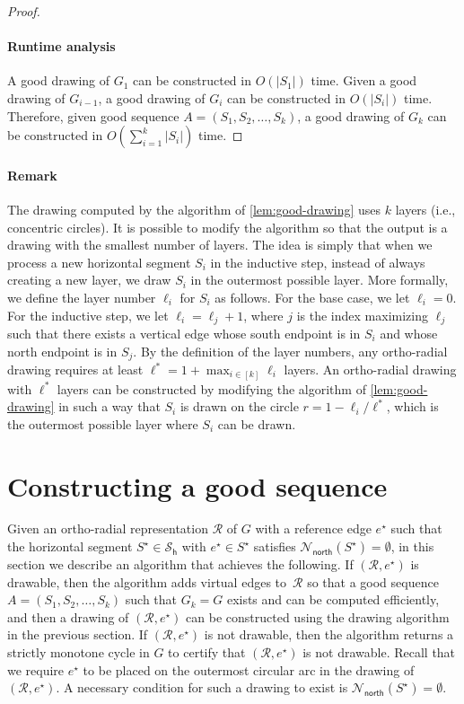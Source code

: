 \documentclass{theoretics}
\newcommand{\RR}{\mathcal{R}}
\newcommand{\PH}{\mathcal{S}_\mathsf{h}}
\newcommand{\Nnorth}{\mathcal{N}_\mathsf{north}}
\newcommand{\eref}{e^\star}
\begin{document}
\begin{proof}
\paragraph{Runtime analysis} A good drawing of $G_1$ can be constructed in $O\left(|S_1|\right)$ time. Given a good drawing of  $G_{i-1}$, a good drawing of $G_{i}$ can be constructed in $O\left(|S_i|\right)$ time. Therefore,  given good sequence $A=(S_1, S_2, \ldots, S_{k})$, a good drawing of $G_k$ can be constructed in $O\left(\sum_{i=1}^k |S_i|\right)$ time.
\end{proof}


\paragraph{Remark} The drawing computed by the algorithm of \cref{lem:good-drawing} uses $k$ layers (i.e., concentric circles). It is possible to modify the algorithm so that the output is a drawing with the smallest number of layers. The idea is simply that when we process a new horizontal segment $S_i$ in the inductive step, instead of always creating a new layer, we draw $S_i$ in the outermost possible layer. More formally, we define the layer number $\ell_i$ for $S_i$ as follows. For the base case, we let $\ell_i = 0$. For the inductive step, we let $\ell_i = \ell_j + 1$, where $j$ is the index maximizing $\ell_j$ such that there exists a vertical edge whose south endpoint is in $S_i$ and whose north endpoint is in $S_j$. By the definition of the layer numbers,  any ortho-radial drawing requires at least $\ell^\ast = 1 + \max_{i \in [k]} \ell_i$ layers. An ortho-radial drawing with $\ell^\ast$ layers can be constructed by modifying the algorithm of \cref{lem:good-drawing} in such a way that $S_i$ is drawn on the circle $r = 1 - \ell_i/\ell^\ast$, which is the outermost possible layer where $S_i$ can be drawn.


\section{Constructing a good sequence}\label{sect:sequence}

 Given an ortho-radial representation $\RR$ of $G$ with a reference edge $\eref$ such that the horizontal segment $S^\star \in \PH$ with $\eref \in S^\star$ satisfies $\Nnorth(S^\star) = \emptyset$, in this section we describe an algorithm that achieves the following. If $(\RR,\eref)$ is drawable, then the algorithm adds virtual edges to~$\RR$  so that a good sequence $A=(S_1, S_2, \ldots, S_{k})$ such that $G_k = G$ exists and can be computed efficiently, and then a drawing of $(\RR,\eref)$ can be constructed using the drawing algorithm in the previous section. If $(\RR,\eref)$ is not drawable, then the algorithm returns a strictly monotone cycle in $G$ to certify that  $(\RR,\eref)$ is not drawable. Recall that we require  $\eref$ to be placed on the outermost circular arc in the drawing of $(\RR,\eref)$. A necessary condition for such a drawing to exist is $\Nnorth(S^\star) = \emptyset$.
 
\end{document}
